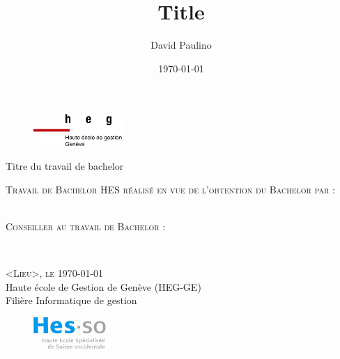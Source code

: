 \documentclass[12pt]{article}
\title{Title}
\author{David Paulino}
\date{\today}
\begin{document}
\begin{titlepage}

    \begin{figure}[h]
        \includegraphics[width=0.3\textwidth]{img/logo_heg-ge.jpg}
    \end{figure}

    \vspace*{0.5cm}

    \begin{center}

        \begingroup \linespread{1,75} \selectfont
        {\Large Titre du travail de bachelor}\\[0,75cm]
        \endgroup



        \vspace{1.5cm}

        \textsc{\large Travail de Bachelor HES réalisé en vue de \newline l’obtention du Bachelor par :}\\[0,50cm]

        \begingroup \linespread{1,75} \selectfont
        \textsc{}\\[0,50cm]
        \endgroup


        \vspace{1cm}


        \textsc{\large Conseiller au travail de Bachelor : }

        \begingroup \linespread{1,75} \selectfont
        \textsc{}\\[1cm]
        \endgroup


        \begingroup \linespread{1,75} \selectfont
        \textsc{\large <Lieu>, le \today}\\[0,25cm]

        {\large Haute école de Gestion de Genève (HEG-GE)}\\[0,25cm]

        {\large Filière Informatique de gestion}\\[0,25cm]
        \endgroup



        \begin{figure}[h]
            \vspace*{1cm}
            \hspace*{12cm}\includegraphics[width=0.25\textwidth]{img/logo_hes-so.jpg}
        \end{figure}

    \end{center}



    \vfill
\end{titlepage}
\end{document}

